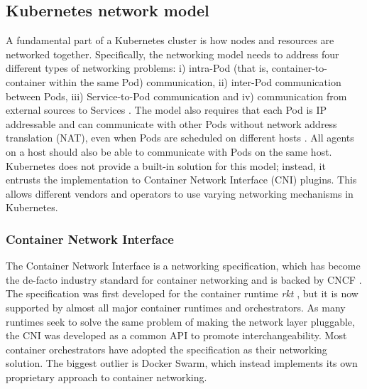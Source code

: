 \documentclass[english, 12pt, a4paper, sci, utf8, a-2b, online]{aaltothesis}
\begin{document}
\subsection{Kubernetes network model}

A fundamental part of a Kubernetes cluster is how nodes and resources are networked together.
Specifically, the networking model needs to address four different types of networking problems: i) intra-Pod (that is, container-to-container within the same Pod) communication, ii) inter-Pod communication between Pods, iii) Service-to-Pod communication and iv) communication from external sources to Services \cite{k8s-docs-cluster-networking}.
The model also requires that each Pod is IP addressable and can communicate with other Pods without network address translation (NAT), even when Pods are scheduled on different hosts \cite{qi2020assessing}.
All agents on a host should also be able to communicate with Pods on the same host.
Kubernetes does not provide a built-in solution for this model; instead, it entrusts the implementation to Container Network Interface (CNI) plugins.
This allows different vendors and operators to use varying networking mechanisms in Kubernetes.

\subsubsection{Container Network Interface} \label{cni}

The Container Network Interface \cite{cni} is a networking specification, which has become the de-facto industry standard for container networking and is backed by CNCF \cite{qi2020assessing}.
The specification was first developed for the container runtime \emph{rkt} \cite{hausenblas2018container}, but it is now supported by almost all major container runtimes and orchestrators.
As many runtimes seek to solve the same problem of making the network layer pluggable, the CNI was developed as a common API to promote interchangeability.
Most container orchestrators have adopted the specification as their networking solution.
The biggest outlier is Docker Swarm, which instead implements its own proprietary approach to container networking.
\end{document}
